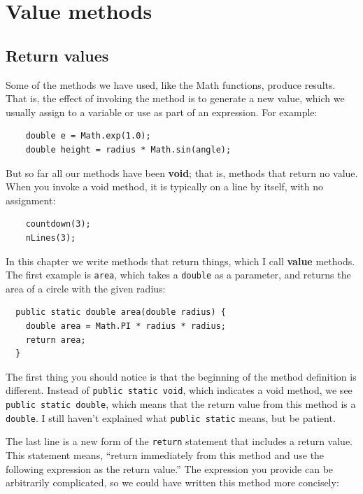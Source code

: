 \chapter{Value methods}
\label{chap05}

\section{Return values}

Some of the methods we have used, like the Math
functions, produce results.  That is, the effect of
invoking the method is to generate a new value, which we
usually assign to a variable or use as part of an expression.
For example:

\begin{lstlisting}
    double e = Math.exp(1.0);
    double height = radius * Math.sin(angle);
\end{lstlisting}
%
But so far all our methods have been {\bf void}; that is, methods
that return no value.  When you invoke a void method, it is typically
on a line by itself, with no assignment:

\begin{lstlisting}
    countdown(3);
    nLines(3);
\end{lstlisting}
%
In this chapter we write methods that return things, which I call
{\bf value} methods.  The first example is {\tt area}, which takes a
{\tt double} as a parameter, and returns the area of a circle with the
given radius:

\begin{lstlisting}
  public static double area(double radius) {
    double area = Math.PI * radius * radius;
    return area;
  }
\end{lstlisting}
%
The first thing you should notice is that the beginning of the
method definition is different.  Instead of {\tt public static
void}, which indicates a void method, we see {\tt public static
double}, which means that the return value from this method
is a {\tt double}.  I still haven't explained what
{\tt public static} means, but be patient.

The last line is a new form of the
{\tt return} statement that includes a return value.  This
statement means, ``return immediately from this method and
use the following expression as the return value.''  The
expression you provide can be arbitrarily complicated,
so we could have written this method more concisely:

